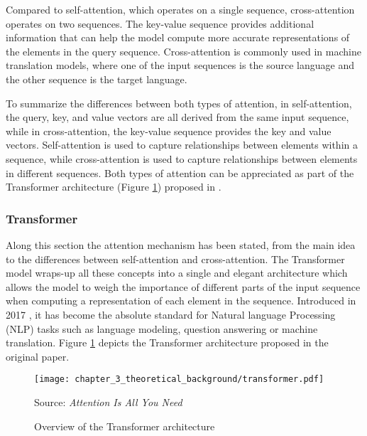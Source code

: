 Compared to self-attention, which operates on a single sequence, cross-attention operates on two sequences. The key-value sequence provides additional information that can help the model compute more accurate representations of the elements in the query sequence. Cross-attention is commonly used in machine translation models, where one of the input sequences is the source language and the other sequence is the target language.

To summarize the differences between both types of attention, in self-attention, the query, key, and value vectors are all derived from the same input sequence, while in cross-attention, the key-value sequence provides the key and value vectors. Self-attention is used to capture relationships between elements within a sequence, while cross-attention is used to capture relationships between elements in different sequences. Both types of attention can be appreciated as part of the Transformer architecture (Figure \ref{fig:chapter_3_theoretical_background/transformer}) proposed in \cite{vaswani2017attention}.

\subsubsection{Transformer}
\label{subsubsec:3_transformer}


Along this section the attention mechanism has been stated, from the main idea to the differences between self-attention and cross-attention. The Transformer model wraps-up all these concepts into a single and elegant architecture which allows the model to weigh the importance of different parts of the input sequence when computing a representation of each element in the sequence. Introduced in 2017 \cite{vaswani2017attention}, it has become the absolute standard for Natural language Processing (NLP) tasks such as language modeling, question answering or machine translation. Figure \ref{fig:chapter_3_theoretical_background/transformer} depicts the Transformer architecture proposed in the original paper.

\begin{figure}[h]
	\centering
	\texttt{[image: chapter\_3\_theoretical\_background/transformer.pdf]}
	\caption{Overview of the Transformer architecture}
	Source: \textit{Attention Is All You Need} \cite{vaswani2017attention}
	\label{fig:chapter_3_theoretical_background/transformer}
\end{figure}


